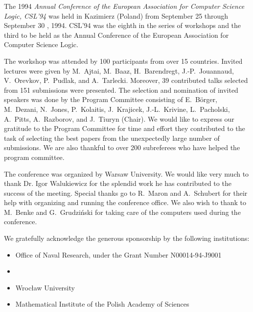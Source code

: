 

\newcommand{\sekcja}[1]{{\vspace{.5cm} \noindent\large \sc \makebox[12.58cm]{#1}}} 

%

\newcommand{\paper}[3]{\contentsline {section} 
{{\bf #2} \hfill\\{\em #1}}{#3}}



The 1994 {\em Annual Conference of the European Association for Computer Science Logic, CSL'94\/} was held in Kazimierz (Poland) from September 25 through September 30 , 1994. CSL'94 was the eighth in the series of workshops and the third to be held as the Annual Conference of the European Association for Computer Science Logic. 

The workshop was attended by 100 participants from over 15 countries. Invited lectures were given by M.~Ajtai, M.~Baaz, H.~Barendregt, J.-P.~Jouannaud, V.~Orevkov, P.~Pudlak, and A.~Tarlecki. Moreover, 39 contributed talks selected from 151 submissions were presented. The selection and nomination of invited speakers was done by the Program Committee consisting of E.~B\"orger, M.~Dezani, N.~Jones, P.~Kolaitis, J.~Krajicek, J.-L.~Krivine, L.~Pacholski, A.~Pitts, A.~Razborov, and \linebreak J.~Tiuryn (Chair). We would like to express our gratitude to the Program Committee for time and effort they contributed to the task of selecting the best papers from the unexpectedly large number of submissions. We are also thankful to over 200 subreferees who have helped the program committee.

The conference was organized by Warsaw University. We would like very much to thank Dr. Igor Walukiewicz for the splendid work he has contributed to the success of the meeting. Special thanks go to R.~Maron and A.~Schubert for their help with organizing and running the conference office. We also wish to thank to M.~Benke and G.~Grudzi\'nski for taking care of the computers used during the conference.

We gratefully acknowledge the generous sponsorship by the following institutions:
\begin{itemize}
\item Office of Naval Research, under the Grant Number N00014-94-J9001 \item
\item Wroc\l aw University
\item Mathematical Institute of the Polish Academy of Sciences \end{itemize}

